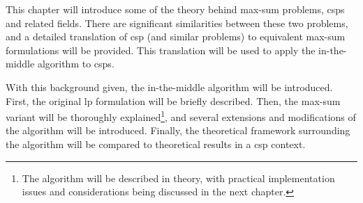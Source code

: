 This chapter will introduce some of the theory behind max-sum problems, \glspl{csp} and related fields.
There are significant similarities between these two problems, and a detailed translation of \gls{csp} (and similar problems) to equivalent max-sum formulations will be provided.
This translation will be used to apply the in-the-middle algorithm to \glspl{csp}.

With this background given, the in-the-middle algorithm will be introduced. First, the original \gls{lp} formulation will be briefly described.
Then, the max-sum variant will be thoroughly explained\footnote{The algorithm will be described in theory, with practical implementation issues and considerations being discussed in the next chapter.}, and several extensions and modifications of the algorithm will be introduced.
Finally, the theoretical framework surrounding the algorithm will be compared to theoretical results in a \gls{csp} context.
